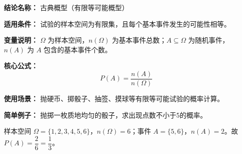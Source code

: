 \textbf{结论名称：} 古典概型（有限等可能概型）

\textbf{适用条件：} 试验的样本空间为有限集，且每个基本事件发生的可能性相等。

\textbf{变量说明：} $\Omega$ 为样本空间，$n(\Omega)$ 为基本事件总数；$A\subseteq\Omega$ 为随机事件，$n(A)$ 为 $A$ 包含的基本事件个数。

\textbf{核心公式：} \[ \boxed{P(A) = \frac{n(A)}{n(\Omega)}} \]

\textbf{使用场景：} 抛硬币、掷骰子、抽签、摸球等有限等可能试验的概率计算。

\textbf{简单例子：} 抛掷一枚质地均匀的骰子，求出现点数不小于5的概率。\par
样本空间 $\Omega=\{1,2,3,4,5,6\}$，$n(\Omega)=6$；事件 $A=\{5,6\}$，$n(A)=2$。故 $P(A)=\dfrac{2}{6}=\dfrac{1}{3}$。